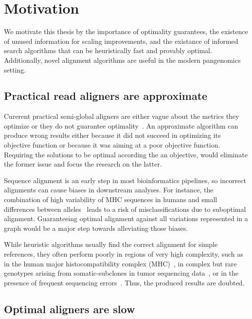 \section*{Motivation}

We motivate this thesis by the importance of optimality guarantees, the
existence of unused information for scaling improvements, and the existance of
informed search algorithms that can be heuristically fast and provably optimal.
Additionally, novel alignment algorithms are useful in the modern pangenomics
setting.

\subsection*{Practical read aligners are approximate}

Curerent practical semi-global aligners are either vague about the metrics they
optimize or they do not guarantee optimality~\cite{alser2021technology}. An
approximate algorithm can produce wrong results either because it did not
succeed in optimizing its objective function or because it was aiming at a poor
objective function. Requiring the solutions to be optimal according the an
objective, would eliminate the former issue and focus the research on the
latter.

Sequence alignment is an early step in most bioinformatics pipelines, so
incorrect alignments can cause biases in downstream analyses. For instance, the
combination of high variability of MHC sequences in humans and small differences
between alleles~\cite{buhler_hla_2011} leads to a risk of misclassifications due
to suboptimal alignment. Guaranteeing optimal alignment against all variations
represented in a graph would be a major step towards alleviating those biases.

While heuristic algorithms usually find the correct alignment for simple
references, they often perform poorly in regions of very high complexity, such
as in the human major histocompatibility complex
(MHC)~\cite{dilthey_improved_2015}, in complex but rare genotypes arising from
somatic-subclones in tumor sequencing data~\cite{harismendy_detection_2011}, or
in the presence of frequent sequencing errors~\cite{salmela_lordec_2014}. Thus,
the produced results are doubted.

\subsection*{Optimal aligners are slow}

